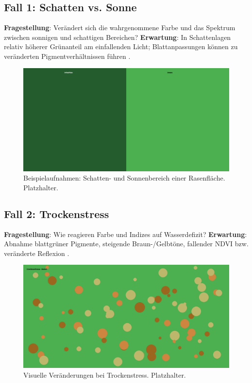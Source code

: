 \subsection{Fall 1: Schatten vs. Sonne}
\textbf{Fragestellung}: Verändert sich die wahrgenommene Farbe und das Spektrum zwischen sonnigen und schattigen Bereichen?  
\textbf{Erwartung}: In Schattenlagen relativ höherer Grünanteil am einfallenden Licht; Blattanpassungen können zu veränderten Pigmentverhältnissen führen \parencite{zhao2012chlorophyll}.
\begin{figure}[H]
  \centering
  \includegraphics[width=.8\textwidth]{bilder/schatten_sonne_foto.png}
  \caption{Beispielaufnahmen: Schatten- und Sonnenbereich einer Rasenfläche. Platzhalter.}
  \label{fig:schatten_sonne}
\end{figure}

\subsection{Fall 2: Trockenstress}
\textbf{Fragestellung}: Wie reagieren Farbe und Indizes auf Wasserdefizit?  
\textbf{Erwartung}: Abnahme blattgrüner Pigmente, steigende Braun-/Gelbtöne, fallender NDVI bzw. veränderte Reflexion \parencite{gao2010lightabsorption}.
\begin{figure}[H]
  \centering
  \includegraphics[width=.8\textwidth]{bilder/trockenstress_foto.png}
  \caption{Visuelle Veränderungen bei Trockenstress. Platzhalter.}
  \label{fig:trockenstress}
\end{figure}

